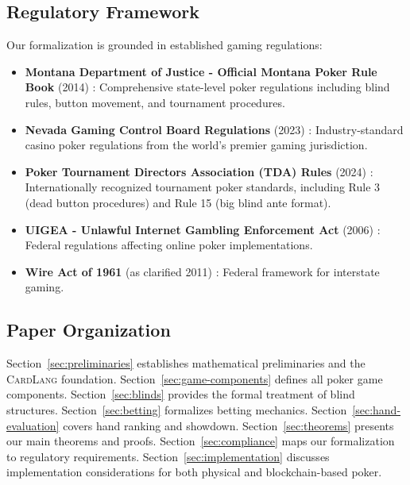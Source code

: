 \documentclass[11pt,a4paper]{article}
\begin{document}
\subsection{Regulatory Framework}

Our formalization is grounded in established gaming regulations:

\begin{itemize}
    \item \textbf{Montana Department of Justice - Official Montana Poker Rule Book} (2014) \cite{montana2014poker}: Comprehensive state-level poker regulations including blind rules, button movement, and tournament procedures.

    \item \textbf{Nevada Gaming Control Board Regulations} (2023) \cite{nevada2023gaming}: Industry-standard casino poker regulations from the world's premier gaming jurisdiction.

    \item \textbf{Poker Tournament Directors Association (TDA) Rules} (2024) \cite{tda2024rules}: Internationally recognized tournament poker standards, including Rule 3 (dead button procedures) and Rule 15 (big blind ante format).

    \item \textbf{UIGEA - Unlawful Internet Gambling Enforcement Act} (2006) \cite{uigea2006}: Federal regulations affecting online poker implementations.

    \item \textbf{Wire Act of 1961} (as clarified 2011) \cite{wireact1961}: Federal framework for interstate gaming.
\end{itemize}

\subsection{Paper Organization}

Section~\ref{sec:preliminaries} establishes mathematical preliminaries and the \textsc{CardLang} foundation. Section~\ref{sec:game-components} defines all poker game components. Section~\ref{sec:blinds} provides the formal treatment of blind structures. Section~\ref{sec:betting} formalizes betting mechanics. Section~\ref{sec:hand-evaluation} covers hand ranking and showdown. Section~\ref{sec:theorems} presents our main theorems and proofs. Section~\ref{sec:compliance} maps our formalization to regulatory requirements. Section~\ref{sec:implementation} discusses implementation considerations for both physical and blockchain-based poker.
\end{document}
